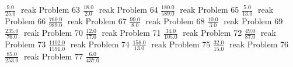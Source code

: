 \documentclass{article}
\begin{document}
\hfill \break
$\displaystyle \frac{9.0}{25.0}$
\newline
\hfill reak
Problem 63
\newline
\hfill \break
$\displaystyle \frac{18.0}{2.0}$
\newline
\hfill reak
Problem 64
\newline
\hfill \break
$\displaystyle \frac{180.0}{589.0}$
\newline
\hfill reak
Problem 65
\newline
\hfill \break
$\displaystyle \frac{5.0}{13.0}$
\newline
\hfill reak
Problem 66
\newline
\hfill \break
$\displaystyle \frac{760.0}{989.0}$
\newline
\hfill reak
Problem 67
\newline
\hfill \break
$\displaystyle \frac{99.0}{8.0}$
\newline
\hfill reak
Problem 68
\newline
\hfill \break
$\displaystyle \frac{10.0}{3.0}$
\newline
\hfill reak
Problem 69
\newline
\hfill \break
$\displaystyle \frac{235.0}{76.0}$
\newline
\hfill reak
Problem 70
\newline
\hfill \break
$\displaystyle \frac{12.0}{17.0}$
\newline
\hfill reak
Problem 71
\newline
\hfill \break
$\displaystyle \frac{34.0}{105.0}$
\newline
\hfill reak
Problem 72
\newline
\hfill \break
$\displaystyle \frac{49.0}{87.0}$
\newline
\hfill reak
Problem 73
\newline
\hfill \break
$\displaystyle \frac{1102.0}{1591.0}$
\newline
\hfill reak
Problem 74
\newline
\hfill \break
$\displaystyle \frac{156.0}{13.0}$
\newline
\hfill reak
Problem 75
\newline
\hfill \break
$\displaystyle \frac{32.0}{15.0}$
\newline
\hfill reak
Problem 76
\newline
\hfill \break
$\displaystyle \frac{85.0}{253.0}$
\newline
\hfill reak
Problem 77
\newline
\hfill \break
$\displaystyle \frac{6.0}{437.0}$
\end{document}
